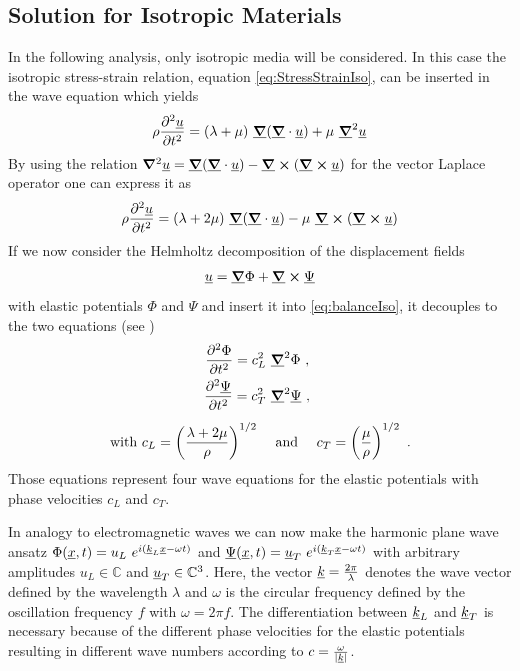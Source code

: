
\subsection{Solution for Isotropic Materials}
\label{sec:IsoSolution}
In the following analysis, only isotropic media will be considered. In this
case the isotropic stress-strain relation, equation
\ref{eq:StressStrainIso}, can be inserted in the wave equation which
yields
\begin{equation}
    \rho \ddiff{\uline{u}}{t} = (\lambda + \mu)\ \uline{\gradient}
    (\uline{\gradient}\cdot \uline{u}) + \mu\ \uline{\gradient}^2 \uline{u}
\end{equation}
By using the relation $\gradient^2 \uline u = \uline{\gradient}
    (\uline{\gradient}\cdot \uline{u}) - \uline{\gradient}
    \cross(\uline{\gradient} \cross \uline{u})$ for the vector Laplace operator
one can express it as
\begin{equation} \label{eq:balanceIso}
    \rho \ddiff{\uline{u}}{t} = (\lambda + 2\mu)\ \uline{\gradient}
    (\uline{\gradient}\cdot \uline{u})- \mu\ \uline{\grad }
    \cross (\uline{\gradient}\cross \uline{u})
\end{equation}
If we now consider the Helmholtz decomposition of the displacement fields
\begin{equation} \label{eq:Helmholtz}
    \uline{u} = \uline{\gradient}\Phi + \uline{\gradient}\cross \uline{\Psi}
\end{equation}
with elastic potentials $\Phi$ and $\Psi$ and insert it into
\ref{eq:balanceIso},
it decouples to the two equations (see \cite{BedfordElasticWaves})
\begin{align}
    \ddiff{\Phi}{t} = c_L^2\
     & \uline{\gradient}^2\Phi    \ ,     \\
    \ddiff{\uline{\Psi}}{t} = c_T^2\
     & \uline{\gradient}^2\uline{\Psi} \ , \\[5pt]
    \text{with } c_L = \left(\frac{\lambda + 2\mu}{\rho}\right)^{1/2} \quad
     &
    \text{ and } \quad c_T = \left(\frac{\mu}{\rho}\right)^{1/2} \ .
    \label{eq:veldef}
\end{align}
Those equations represent four wave equations for the elastic potentials with
phase velocities $c_L$ and $c_T$.

In analogy to electromagnetic waves we can now make the harmonic
plane wave ansatz $\Phi(\underline{x}, t)= u_L\
    e^{i(\underline{k}_L \underline{x}-\omega t)}$ and $\underline{\Psi}(\underline{x}, t)
    =
    \underline{u}_T \ e^{i(\underline{k}_T\underline{x}-\omega t)}$ with arbitrary
amplitudes $u_L\in\mathbb{C}$ and $\underline{u}_T\in \mathbb{C}^3$.
Here, the vector
$\underline{k}=\frac{2\pi}{\lambda}$ denotes the wave vector defined by the
wavelength $\lambda$ and $\omega$ is the circular frequency defined by the
oscillation frequency $f$ with	$\omega = 2 \pi f$. The differentiation between
$\underline{k}_L$ and $\underline{k}_T$ is necessary because of the different
phase velocities for the elastic potentials resulting in different wave numbers
according to $c = \frac{\omega}{|\underline{k}|}$.

